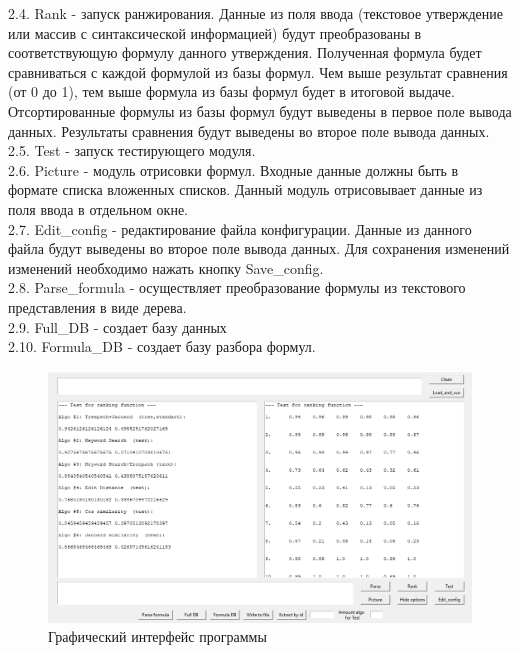 \documentclass[12pt]{article}
\begin{document}
2.4. Rank - запуск ранжирования. Данные из поля ввода (текстовое утверждение или массив с синтаксической информацией) будут преобразованы  в соответствующую формулу данного утверждения.
 Полученная формула будет сравниваться с каждой формулой из базы формул. Чем выше результат сравнения (от 0 до 1), тем выше формула из базы формул будет в итоговой выдаче. Отсортированные формулы из базы формул будут выведены в первое поле вывода данных. Результаты сравнения будут выведены во второе поле вывода данных.  \\
	   
2.5. Test - запуск тестирующего модуля. \\

2.6. Picture - модуль отрисовки формул.   Входные данные должны быть в формате списка вложенных списков. Данный модуль отрисовывает данные из поля ввода в отдельном окне. \\
	
2.7. Edit\_config - редактирование файла конфигурации. Данные из данного файла будут выведены во второе поле вывода данных. Для сохранения изменений изменений необходимо нажать кнопку Save\_config. \\

2.8. Parse\_formula - осуществляет преобразование формулы из текстового представления в виде дерева.\\

2.9. Full\_DB - создает базу данных \\

2.10. Formula\_DB - создает базу разбора формул. \\
	
\begin{figure}
\centering
\includegraphics[scale=0.44]{Picture_1.png}
\caption{Графический интерфейс программы}
\end{figure}
		  
\end{document}
